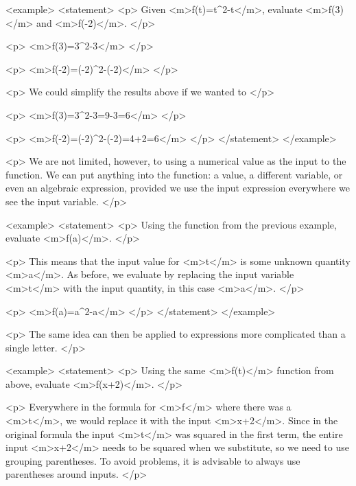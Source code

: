         <example>
            <statement>
                <p>
                    Given <m>f(t)=t^{2}-t</m>, evaluate <m>f(3)</m> and <m>f(-2)</m>.
                </p>

                <p>
                    <m>f(3)=3^{2}-3</m>
                </p>

                <p>
                    <m>f(-2)=(-2)^{2}-(-2)</m>
                </p>

                <p>
                    We could simplify the results above if we wanted to
                </p>

                <p>
                    <m>f(3)=3^{2}-3=9-3=6</m>
                </p>

                <p>
                    <m>f(-2)=(-2)^{2}-(-2)=4+2=6</m>
                </p>
            </statement>
        </example>

        <p>
            We are not limited, however, to using a numerical value as the input to the function.
            We can put anything into the function: a value, a different variable, or even an algebraic expression, provided we use the input expression everywhere we see the input variable.
        </p>

        <example>
            <statement>
                <p>
                    Using the function from the previous example, evaluate <m>f(a)</m>.
                </p>

                <p>
                    This means that the input value for <m>t</m> is some unknown quantity <m>a</m>.
                    As before, we evaluate by replacing the input variable <m>t</m> with the input quantity, in this case <m>a</m>.
                </p>

                <p>
                    <m>f(a)=a^{2}-a</m>
                </p>
            </statement>
        </example>

        <p>
            The same idea can then be applied to expressions more complicated than a single letter.
        </p>

        <example>
            <statement>
                <p>
                    Using the same <m>f(t)</m> function from above, evaluate <m>f(x+2)</m>.
                </p>

                <p>
                    Everywhere in the formula for <m>f</m> where there was a <m>t</m>, we would replace it with the input <m>x+2</m>.
                    Since in the original formula the input <m>t</m> was squared in the first term, the entire input <m>x+2</m> needs to be squared when we substitute, so we need to use grouping parentheses.
                    To avoid problems, it is advisable to always use parentheses around inputs.
                </p>


